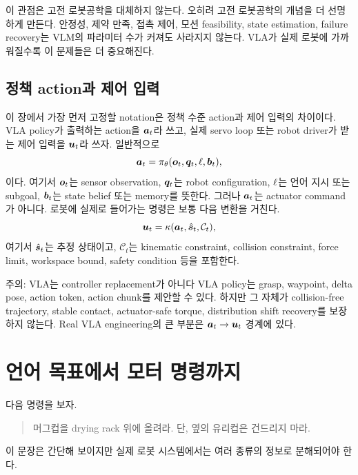 이 관점은 고전 로봇공학을 대체하지 않는다. 오히려 고전 로봇공학의 개념을 더 선명하게 만든다. 안정성, 제약 만족, 접촉 제어, 모션 feasibility, state estimation, failure recovery는 VLM의 파라미터 수가 커져도 사라지지 않는다. VLA가 실제 로봇에 가까워질수록 이 문제들은 더 중요해진다.

\subsection{정책 action과 제어 입력}

이 장에서 가장 먼저 고정할 notation은 정책 수준 action과 제어 입력의 차이이다. VLA policy가 출력하는 action을 $\bm{a}_t$라 쓰고, 실제 servo loop 또는 robot driver가 받는 제어 입력을 $\bm{u}_t$라 쓰자. 일반적으로
\begin{equation}
  \bm{a}_t = \pi_\theta(\bm{o}_t, \bm{q}_t, \ell, \bm{b}_t),
  \label{eq:vla-policy}
\end{equation}
이다. 여기서 $\bm{o}_t$는 sensor observation, $\bm{q}_t$는 robot configuration, $\ell$는 언어 지시 또는 subgoal, $\bm{b}_t$는 state belief 또는 memory를 뜻한다. 그러나 $\bm{a}_t$는 actuator command가 아니다. 로봇에 실제로 들어가는 명령은 보통 다음 변환을 거친다.
\begin{equation}
  \bm{u}_t = \kappa(\bm{a}_t, \hat{\bm{s}}_t, \mathcal{C}_t),
  \label{eq:controller}
\end{equation}
여기서 $\hat{\bm{s}}_t$는 추정 상태이고, $\mathcal{C}_t$는 kinematic constraint, collision constraint, force limit, workspace bound, safety condition 등을 포함한다.

\begin{warningbox}{주의: VLA는 controller replacement가 아니다}
VLA policy는 grasp, waypoint, delta pose, action token, action chunk를 제안할 수 있다. 하지만 그 자체가 collision-free trajectory, stable contact, actuator-safe torque, distribution shift recovery를 보장하지 않는다. Real VLA engineering의 큰 부분은 $\bm{a}_t \rightarrow \bm{u}_t$ 경계에 있다.
\end{warningbox}

\section{언어 목표에서 모터 명령까지}

다음 명령을 보자.
\begin{quote}
머그컵을 drying rack 위에 올려라. 단, 옆의 유리컵은 건드리지 마라.
\end{quote}

이 문장은 간단해 보이지만 실제 로봇 시스템에서는 여러 종류의 정보로 분해되어야 한다.

